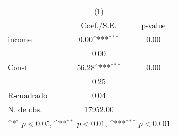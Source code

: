{
\def\sym#1{\ifmmode^{#1}\else\(^{#1}\)\fi}
\begin{tabular}{l*{1}{cc}}
\hline\hline
            &\multicolumn{1}{c}{(1)}         &            \\
            &  Coef./S.E.         &     p-value\\
\hline
income      &        0.00\sym{***}&        0.00\\
            &        0.00         &            \\
Const       &       56.28\sym{***}&        0.00\\
            &        0.25         &            \\
\hline
R-cuadrado  &        0.04         &            \\
N. de obs.  &    17952.00         &            \\
\hline\hline
\multicolumn{3}{l}{\footnotesize \sym{*} \(p<0.05\), \sym{**} \(p<0.01\), \sym{***} \(p<0.001\)}\\
\end{tabular}
}
